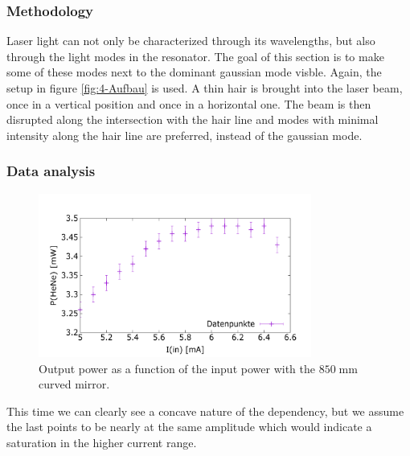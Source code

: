 \documentclass[../main.tex]{subfiles}
\begin{document}
\subsubsection*{Methodology}
    Laser light can not only be characterized through its wavelengths, but also through the light modes in the resonator. The goal of this section is to make some of these modes next to the dominant gaussian mode visble. Again, the setup in figure \ref{fig:4-Aufbau} is used. A thin hair is brought into the laser beam, once in a vertical position and once in a horizontal one. The beam is then disrupted along the intersection with the hair line and modes with minimal intensity along the hair line are preferred, instead of the gaussian mode.

\subsubsection*{Data analysis}

    \begin{figure}[H]
        \centering
        \includegraphics[width=0.8\textwidth]{Bilddateien/6/P(HeNe)overI(in).png}
        \caption{Output power as a function of the input power with the $850\;\si{\mm}$ curved mirror.}
        \label{fig:output_power_over_input_power_curved}
    \end{figure}

    This time we can clearly see a concave nature of the dependency, but we assume the last points to be nearly at the same amplitude which would indicate a saturation in the higher current range. 
\end{document}
